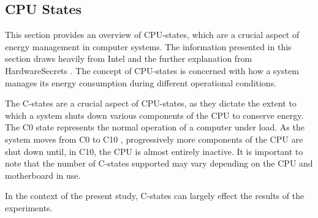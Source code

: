 \subsection{CPU States}\label{subsec:cpustates}

This section provides an overview of CPU-states, which are a crucial aspect of energy management in computer systems. The information presented in this section draws heavily from Intel \cite{CIntel} and the further explanation from HardwareSecrets \cite{CHard}. The concept of CPU-states is concerned with how a system manages its energy consumption during different operational conditions.

The C-states are a crucial aspect of CPU-states, as they dictate the extent to which a system shuts down various components of the CPU to conserve energy. The C0 state represents the normal operation of a computer under load. As the system moves from C0 to C10 \cite{biksbois}, progressively more components of the CPU are shut down until, in C10, the CPU is almost entirely inactive. It is important to note that the number of C-states supported may vary depending on the CPU and motherboard in use.




In the context of the present study, C-states can largely effect the results of the experiments.
